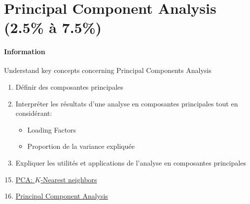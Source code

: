 \documentclass[12pt, titlepage, french]{report}
\begin{document}
\newpage
\chapter[Principal Component Analysis]{Principal Component Analysis (2.5\% à 7.5\%)}

\subsubsection{Information}

\begin{distributions}[Objective]
Understand key concepts concerning Principal Components Analysis
\end{distributions}

\begin{outcomes}
\begin{enumerate}
	\item	Définir des composantes principales
	\item	Interpréter les résultats d'une analyse en composantes principales tout en considérant:
	\begin{itemize}
		\item	\og Loading Factors \fg{} 
		\item	Proportion de la variance expliquée
	\end{itemize}
	\item	Expliquer les utilités et applications de l'analyse en composantes principales
\end{enumerate}
\end{outcomes}

\begin{ASM_chapter}
\begin{enumerate}
  \setcounter{enumi}{14}
	\item	\hyperref[PCA-KNN]{PCA: $K$-Nearest neighbors}
  \setcounter{enumi}{16}
	\item	\hyperref[PCA-KNN]{Principal Component Analysis}
\end{enumerate}
\end{ASM_chapter}
\end{document}
